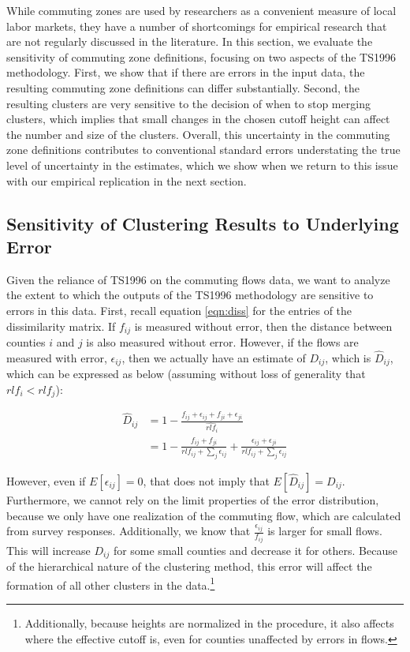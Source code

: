 While commuting zones are used by researchers as a convenient measure of local labor markets, they have a number of shortcomings for empirical research that are not regularly discussed in the literature. In this section, we evaluate the sensitivity of commuting zone definitions, focusing on two aspects of the TS1996 methodology. First, we show that if there are errors in the input data, the resulting commuting zone definitions can differ substantially. Second, the resulting clusters are very sensitive to the decision of when to stop merging clusters, which implies that small changes in the chosen cutoff height can affect the number and size of the clusters. Overall, this uncertainty in the commuting zone definitions contributes to conventional standard errors understating the true level of uncertainty in the estimates, which we show when we return to this issue with our empirical replication in the next section.

\subsection{Sensitivity of Clustering Results to Underlying Error}

Given the reliance of TS1996 on the commuting flows data, we want to analyze the extent to which the outputs of the TS1996 methodology are sensitive to errors in this data. First, recall equation \ref{eqn:diss} for the entries of the dissimilarity matrix. If $f_{ij}$ is measured without error, then the distance between counties $i$ and $j$ is also measured without error. However, if the flows are measured with error, $\epsilon_{ij}$, then we actually have an estimate of $D_{ij}$, which is $\hat{D}_{ij}$, which can be expressed as below (assuming without loss of generality that $rlf_i < rlf_j$):


\begin{align*}
\hat{D}_{ij} &= 1 - \frac{f_{ij} + \epsilon_{ij} + f_{ji} + \epsilon_{ji}}{\hat{rlf}_i} \\
&= 1- \frac{f_{ij} + f_{ji}}{rlf_{ij} + \sum_j \epsilon_{ij}} +  \frac{\epsilon_{ij} + \epsilon_{ji}}{rlf_{ij} + \sum_j \epsilon_{ij}}
\end{align*}


However, even if $E[\epsilon_{ij}]=0$, that does not imply that $E[\hat{D}_{ij}] = D_{ij}$. Furthermore, we cannot rely on the limit properties of the error distribution, because we only have one realization of the commuting flow, which are calculated from survey responses. Additionally, we know that $\frac{\epsilon_{ij}}{f_{ij}}$ is larger for small flows. This will increase $D_{ij}$ for some small counties and decrease it for others. Because of the hierarchical nature of the clustering method, this error will affect the formation of all other clusters in the data.\footnote{Additionally, because heights are normalized in the procedure, it also affects where the effective cutoff is, even for counties unaffected by errors in flows.}

